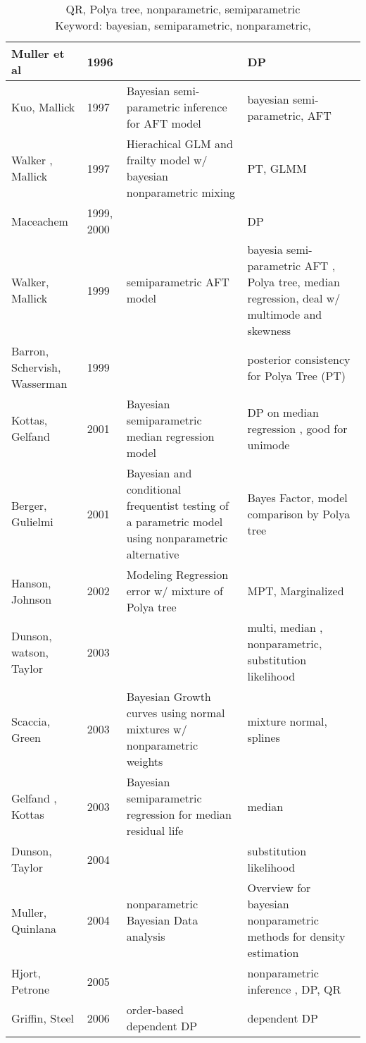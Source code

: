 \documentclass{article}
\begin{document}
\begin{table}[htbp]
\caption[]{\label{tab:qr2} QR, Polya tree, nonparametric,
  semiparametric \\
Keyword: bayesian, semiparametric, nonparametric,}
\vspace{4mm}
\begin{tabular}[tb]{m{4cm}|m{1cm}|m{5cm}|m{5cm}}
\hline
Muller et al & 1996 && DP \\
\hline
Kuo, Mallick & 1997 & Bayesian semi-parametric inference for AFT model
& bayesian semi-parametric, AFT \\
\hline
Walker , Mallick & 1997 & Hierachical GLM and frailty model w/
bayesian nonparametric mixing & PT, GLMM \\
\hline
Maceachem & 1999, 2000 && DP \\
\hline
Walker, Mallick & 1999 & semiparametric AFT model & bayesia
semi-parametric AFT , Polya tree, median regression, deal w/ multimode
and skewness\\
\hline
Barron, Schervish, Wasserman & 1999& & posterior consistency for Polya
Tree (PT) \\
\hline
Kottas, Gelfand & 2001 & Bayesian semiparametric median regression
model & DP on median regression , good for unimode \\
\hline
Berger, Gulielmi & 2001 & Bayesian and conditional frequentist testing
of a parametric model using nonparametric alternative & Bayes Factor,
model comparison by Polya tree\\
\hline
Hanson, Johnson & 2002 & Modeling Regression error w/ mixture of Polya
tree & MPT, Marginalized \\
\hline
Dunson, watson, Taylor & 2003 & & multi, median , nonparametric,
substitution likelihood\\
\hline
Scaccia, Green & 2003 & Bayesian Growth curves using normal mixtures
w/ nonparametric weights & mixture normal, splines \\
\hline
Gelfand , Kottas & 2003 & Bayesian semiparametric regression for
median residual life & median \\
\hline
Dunson, Taylor & 2004 && substitution likelihood \\
\hline
Muller, Quinlana & 2004 & nonparametric Bayesian Data analysis &
Overview for bayesian nonparametric methods for density estimation \\
 \hline
Hjort, Petrone & 2005 & & nonparametric inference , DP, QR \\
\hline
Griffin, Steel & 2006 & order-based dependent DP & dependent DP \\

\end{tabular}
\end{table}
\end{document}
